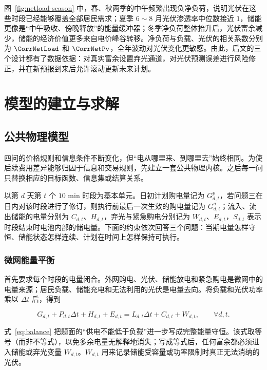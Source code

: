 图~\ref{fig:netload-season} 中，春、秋两季的中午频繁出现负净负荷，说明光伏在这些时段已经能够覆盖全部居民需求；夏季 $6\sim8$ 月光伏渗透率中位数接近 $1$，储能更像是“中午吸收、傍晚释放”的能量缓冲器；冬季净负荷整体抬升后，光伏富余减少，储能的经济价值更多来自电价峰谷转移。净负荷与负载、光伏的相关系数分别为 $\CorrNetLoad$ 和 $\CorrNetPv$，全年波动对光伏变化更敏感。由此，后文的三个设计都有了数据依据：对真实富余设置弃光通道，对光伏预测误差进行风险修正，并在新预报到来后允许滚动更新未来计划。

\section{模型的建立与求解}

\subsection{公共物理模型}

四问的价格规则和信息条件不断变化，但“电从哪里来、到哪里去”始终相同。为使后续费用差异能够归因于信息和交易规则，先建立一套公共物理内核。之后每一问只替换相应的目标函数、信息集或结算关系。

以第 $d$ 天第 $t$ 个 $10$ min 时段为基本单元。日初计划购电量记为 $G^p_{d,t}$，若问题三在日内对该时段进行了修订，则执行前最后一次生效的购电量记为 $G^a_{d,t}$；流入、流出储能的电量分别为 $C_{d,t}$、$H_{d,t}$，弃光与紧急购电分别记为 $W_{d,t}$、$E_{d,t}$，$S_{d,t}$ 表示时段结束时电池内部的储电量。下面的约束依次回答三个问题：当期电量怎样守恒、储能状态怎样连续、计划在时间上怎样保持可执行。

\subsubsection{微网能量平衡}

首先要求每个时段的电量闭合。外网购电、光伏、储能放电和紧急购电是微网中的电量来源；居民负载、储能充电和无法利用的光伏是电量去向。将负载和光伏功率乘以 $\Delta t$ 后，得到

\begin{equation}
    G_{d,t}+P_{d,t}\Delta t+H_{d,t}+E_{d,t}
    =L_{d,t}\Delta t+C_{d,t}+W_{d,t},
    \qquad \forall d,t .
    \label{eq:balance}
\end{equation}

式~\eqref{eq:balance} 把题面的“供电不能低于负载”进一步写成完整能量守恒。该式取等号（而非不等式），以免多余电量无解释地消失；写成等式后，任何富余都必须进入储能或弃光变量 $W_{d,t}$。$W_{d,t}$ 用来记录储能受容量或功率限制时真正无法消纳的光伏。

